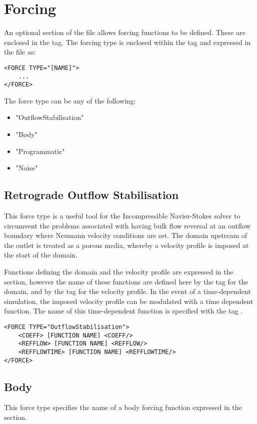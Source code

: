 \section{Forcing}
An optional section of the file allows forcing functions to be defined. These are enclosed in the
 tag. The forcing type is enclosed within the  tag and expressed in the file as:

\begin{lstlisting}[style=XMLStyle] 
<FORCE TYPE="[NAME]">
    ...
</FORCE>
\end{lstlisting}

The force type can be any of the following:
\begin{itemize}
    \item "OutflowStabilisation" 
    \item "Body" 
    \item "Programmatic"
    \item "Noise"
\end{itemize}

\subsection{Retrograde Outflow Stabilisation}
This force type is a useful tool for the Incompressible Navier-Stokes solver to circumvent the problems associated with having bulk flow reversal at an outflow boundary where Neumann velocity conditions are set. The domain upstream of the outlet is treated as a porous media, whereby a velocity profile is imposed at the start of the domain.

Functions defining the domain and the velocity profile are expressed in the  section, however the name of these functions are defined here by the  tag for the domain, and by the  tag for the velocity profile. In the event of a time-dependent simulation, the imposed velocity profile can be modulated with a time dependent function. The name of this time-dependent function is specified with the tag . 

\begin{lstlisting}[style=XMLStyle] 
<FORCE TYPE="OutflowStabilisation">
    <COEFF> [FUNCTION NAME] <COEFF/>
    <REFFLOW> [FUNCTION NAME] <REFFLOW/>
    <REFFLOWTIME> [FUNCTION NAME] <REFFLOWTIME/>
</FORCE>
\end{lstlisting}


\subsection{Body}
This force type specifies the name of a body forcing function expressed in the  section.

